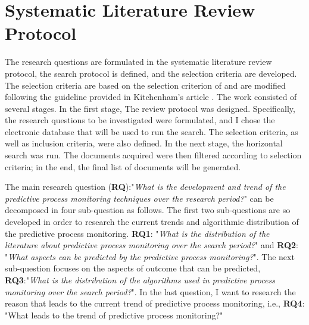 \documentclass[runningheads]{llncs}
\begin{document}
	\section{Systematic Literature Review Protocol}
		The research questions are formulated in the systematic literature review protocol, the search protocol is defined, and the selection criteria are developed. The selection criteria are based on the selection criterion of \cite{original} and are modified following the guideline provided in Kitchenham's article \cite{guidline}. The work consisted of several stages. In the first stage, The review protocol was designed. Specifically, the research questions to be investigated were formulated, and I chose the electronic database that will be used to run the search. The selection criteria, as well as inclusion criteria, were also defined. In the next stage, the horizontal search was run. The documents acquired were then filtered according to selection criteria; in the end, the final list of documents will be generated.
		
		The main research question (\textbf{RQ}):"\textit{What is the development and trend of the predictive process monitoring techniques over the research period?}" can be decomposed in four sub-question as follows. The first two sub-questions are so developed in order to research the current trends and algorithmic distribution of the predictive process monitoring. \textbf{RQ1}: "\textit{What is the distribution of the literature about predictive process monitoring over the search period?}" and \textbf{RQ2}: "\textit{What aspects can be predicted by the predictive process monitoring?}". The next sub-question focuses on the aspects of outcome that can be predicted, \textbf{RQ3}:"\textit{What is the distribution of the algorithms used in predictive process monitoring over the search period?}". In the last question, I want to research the reason that leads to the current trend of predictive process monitoring, i.e., \textbf{RQ4}: "What leads to the trend of predictive process monitoring?"
		
\end{document}
